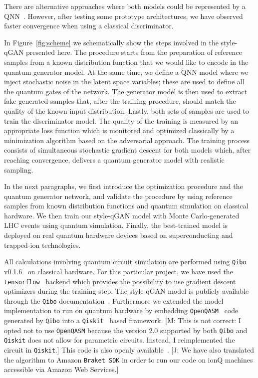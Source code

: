 \documentclass[twocolumn,preprintnumbers,superscriptaddress]{revtex4-2}
\newcommand{\commentJB}[1]{{\color{blue} {[J: #1]}}}
\newcommand{\commentMC}[1]{{\color{magenta} {[M: #1]}}}
\begin{document}
%
There are alternative approaches where both models could be represented by a
QNN~\cite{dallaire2018quantum, hu2019quantum, benedetti2019adversarial, romero2021variational, niu2021entangling}. However, after testing some prototype architectures, we have observed faster convergence when using a classical discriminator.

In Figure~\ref{fig:scheme} we schematically show the steps involved in the style-qGAN
presented here. The procedure starts from the preparation of reference samples from a
known distribution function that we would like to encode in the quantum
generator model. At the same time, we define a QNN model where
we inject stochastic noise in the latent space variables; these are used to
define all the quantum gates of the network. The generator model is then used to extract fake generated samples
that, after the training procedure, should match the quality of the known input
distribution. Lastly, both sets of samples are used to train the discriminator
model. The quality of the training is measured by an appropriate loss function
which is monitored and optimized classically by a minimization algorithm based on
the adversarial approach. The training process consists of simultaneous
stochastic gradient descent for both models which, after reaching convergence,
delivers a quantum generator model with realistic sampling.

In the next paragraphs, we first introduce the optimization procedure and the quantum
generator network, and validate the procedure by using reference samples from known
distribution functions and quantum simulation on classical hardware. We then
train our style-qGAN model with Monte Carlo-generated LHC events using quantum
simulation. Finally, the best-trained model is deployed on real quantum hardware
devices based on superconducting and trapped-ion technologies.

All calculations involving quantum circuit simulation are performed using
{\tt Qibo} v0.1.6~\cite{efthymiou2020qibo,stavros_efthymiou_2021_5088103} on
classical hardware. For this particular project, we have used the {\tt
tensorflow}~\cite{tensorflow2015-whitepaper} backend which provides the
possibility to use gradient descent optimizers during the training step. The
style-qGAN model is publicly available through the {\tt Qibo}
documentation~\cite{add_cite_tutorial}. Furthermore we extended the model implementation to run on quantum hardware by embedding {\tt OpenQASM}~\cite{cross2017open} code generated by {\tt Qibo} into a {\tt Qiskit}~\cite{gadi_aleksandrowicz_2019_2562111} based framework. 
 \commentMC{This is not correct: I opted not to use \texttt{OpenQASM} because the version 2.0 supported by both \texttt{Qibo} and \texttt{Qiskit} does not allow for parametric circuits. Instead, I reimplemented the circuit in \texttt{Qiskit}.}
 This code is also openly available~\cite{add_cite_tutorial}. \commentJB{We have also translated the algorithm to Amazon \texttt{Braket SDK} in order to run our code on ionQ machines accessible via Amazon Web Services.}
\end{document}
